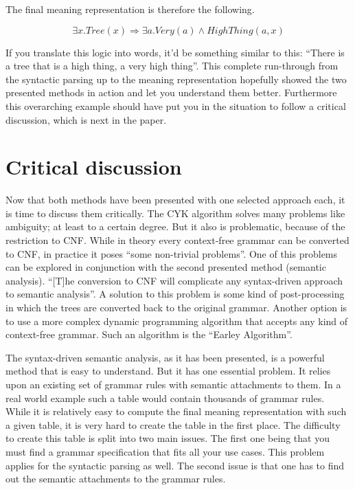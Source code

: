 \documentclass[12pt,twoside]{scrartcl}
\theoremstyle{plain}
\theoremstyle{definition}
\theoremstyle{remark}
\begin{document}
		The final meaning representation is therefore the following.
		
		\[
			\exists x.Tree(x) \Rightarrow \exists a.Very(a) \wedge HighThing(a, x)
		\]
		
		If you translate this logic into words, it'd be something similar to this: ``There is a tree that is a high thing, a very high thing''. This complete run-through from the syntactic parsing up to the meaning representation hopefully showed the two presented methods in action and let you understand them better. Furthermore this overarching example should have put you in the situation to follow a critical discussion, which is next in the paper.
		
\section{Critical discussion}
\label{sec:critDiscussion}


	Now that both methods have been presented with one selected approach each, it is time to discuss them critically. The CYK algorithm solves many problems like ambiguity; at least to a certain degree. But it also is problematic, because of the restriction to CNF. While in theory every context-free grammar can be converted to CNF, in practice it poses ``some non-trivial problems''\cite[p.~475]{Jurafsky2009b}. One of this problems can be explored in conjunction with the second presented method (semantic analysis). ``[T]he conversion to CNF will complicate any syntax-driven approach to semantic analysis''\cite[p.~475]{Jurafsky2009b}. A solution to this problem is some kind of post-processing in which the trees are converted back to the original grammar.\cite{Jurafsky2009b} Another option is to use a more complex dynamic programming algorithm that accepts any kind of context-free grammar. Such an algorithm is the ``Earley Algorithm''\cite[p.~477]{Jurafsky2009b}.
	
	The syntax-driven semantic analysis, as it has been presented, is a powerful method that is easy to understand. But it has one essential problem. It relies upon an existing set of grammar rules with semantic attachments to them. In a real world example such a table would contain thousands of grammar rules.\cite{Russel2010} While it is relatively easy to compute the final meaning representation with such a given table, it is very hard to create the table in the first place. The difficulty to create this table is split into two main issues. The first one being that you must find a grammar specification that fits all your use cases. This problem applies for the syntactic parsing as well. The second issue is that one has to find out the semantic attachments to the grammar rules.
	
\end{document}
